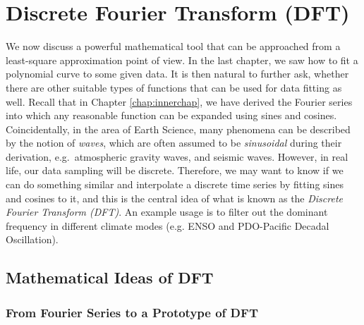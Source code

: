 \chapter{Discrete Fourier Transform (DFT)}
\label{chap:DFT}
We now discuss a powerful mathematical tool that can be approached from a least-square approximation point of view. In the last chapter, we saw how to fit a polynomial curve to some given data. It is then natural to further ask, whether there are other suitable types of functions that can be used for data fitting as well. Recall that in Chapter \ref{chap:innerchap}, we have derived the Fourier series into which any reasonable function can be expanded using sines and cosines. Coincidentally, in the area of Earth Science, many phenomena can be described by the notion of \textit{waves}, which are often assumed to be \textit{sinusoidal} during their derivation, e.g.\ atmospheric gravity waves, and seismic waves. However, in real life, our data sampling will be discrete. Therefore, we may want to know if we can do something similar and interpolate a discrete time series by fitting sines and cosines to it, and this is the central idea of what is known as the \textit{Discrete Fourier Transform (DFT)}. An example usage is to filter out the dominant frequency in different climate modes (e.g. ENSO and PDO-Pacific Decadal Oscillation).

\section{Mathematical Ideas of DFT}
\label{section:DFT}

\subsection{From Fourier Series to a Prototype of DFT}
\label{section:FouriertoDFT}

